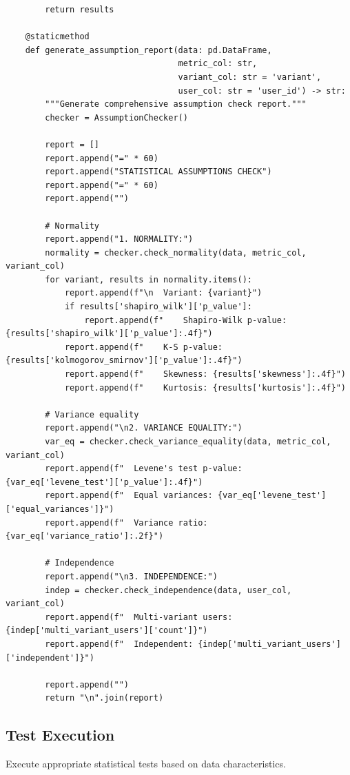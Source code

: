 \begin{lstlisting}
        return results

    @staticmethod
    def generate_assumption_report(data: pd.DataFrame,
                                   metric_col: str,
                                   variant_col: str = 'variant',
                                   user_col: str = 'user_id') -> str:
        """Generate comprehensive assumption check report."""
        checker = AssumptionChecker()

        report = []
        report.append("=" * 60)
        report.append("STATISTICAL ASSUMPTIONS CHECK")
        report.append("=" * 60)
        report.append("")

        # Normality
        report.append("1. NORMALITY:")
        normality = checker.check_normality(data, metric_col, variant_col)
        for variant, results in normality.items():
            report.append(f"\n  Variant: {variant}")
            if results['shapiro_wilk']['p_value']:
                report.append(f"    Shapiro-Wilk p-value: {results['shapiro_wilk']['p_value']:.4f}")
            report.append(f"    K-S p-value: {results['kolmogorov_smirnov']['p_value']:.4f}")
            report.append(f"    Skewness: {results['skewness']:.4f}")
            report.append(f"    Kurtosis: {results['kurtosis']:.4f}")

        # Variance equality
        report.append("\n2. VARIANCE EQUALITY:")
        var_eq = checker.check_variance_equality(data, metric_col, variant_col)
        report.append(f"  Levene's test p-value: {var_eq['levene_test']['p_value']:.4f}")
        report.append(f"  Equal variances: {var_eq['levene_test']['equal_variances']}")
        report.append(f"  Variance ratio: {var_eq['variance_ratio']:.2f}")

        # Independence
        report.append("\n3. INDEPENDENCE:")
        indep = checker.check_independence(data, user_col, variant_col)
        report.append(f"  Multi-variant users: {indep['multi_variant_users']['count']}")
        report.append(f"  Independent: {indep['multi_variant_users']['independent']}")

        report.append("")
        return "\n".join(report)

\end{lstlisting}

\subsection{Test Execution}

Execute appropriate statistical tests based on data characteristics.

